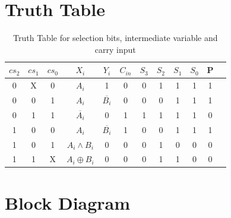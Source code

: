 \documentclass[18pt]{article}
\begin{document}
\section{Truth Table}


\begin{table}[!h]
    \captionsetup{font=large}
    \centering
    \begin{tabular}{||c|c|c|c|c|c|c|c|c|c|c|c||}
    \hline
     $cs_{2}$ & $cs_{1}$ & $cs_{0}$ & $X_{i}$ & $Y_{i}$ & $C_{in}$ & $S_{3}$ & $S_{2}$ & $S_{1}$ & $S_{0}$ & P \\
     \hline
     \hline
     0 & X & 0 & $A_{i}$             & 1            & 0 & 0 & 1 & 1 & 1 & 1 \\ \hline
     0 & 0 & 1 & $A_{i}$             & $\overline{B_{i}}$ & 0 & 0 & 0 & 1 & 1 & 1 \\ \hline
     0 & 1 & 1 & $\overline{A_{i}}$        & 0            & 1 & 1 & 1 & 1 & 1 & 0 \\ \hline
     1 & 0 & 0 & $A_{i}$             & $\overline{B_{i}}$ & 1 & 0 & 0 & 1 & 1 & 1 \\ \hline
     1 & 0 & 1 & $A_{i} \land B_{i}$ & 0            & 0 & 0 & 1 & 0 & 0 & 0 \\ \hline
     1 & 1 & X &   $A_{i}\oplus B_{i}$        & 0            & 0 & 0 & 1 & 1 & 0 & 0 \\ 
    \hline
    \end{tabular}
    \caption{Truth Table for selection bits, intermediate variable and carry input}
\end{table}
\section{Block Diagram}
\end{document}
